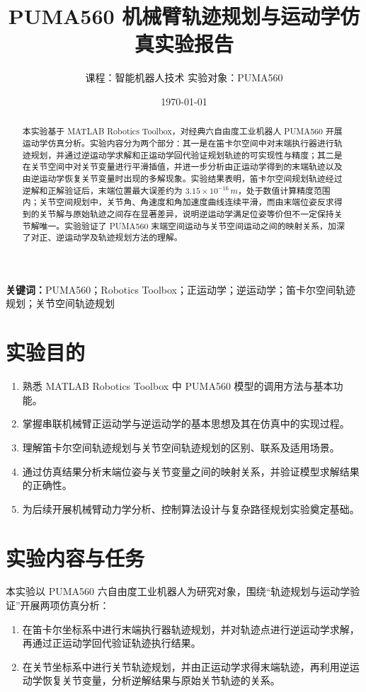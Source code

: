 \documentclass[UTF8,a4paper,12pt]{ctexart}
\title{PUMA560 机械臂轨迹规划与运动学仿真实验报告}
\author{课程：智能机器人技术 \qquad 实验对象：PUMA560}
\date{\today}
\begin{document}
\maketitle

\begin{abstract}
本实验基于 MATLAB Robotics Toolbox，对经典六自由度工业机器人 PUMA560 开展运动学仿真分析。实验内容分为两个部分：其一是在笛卡尔空间中对末端执行器进行轨迹规划，并通过逆运动学求解和正运动学回代验证规划轨迹的可实现性与精度；其二是在关节空间中对关节变量进行平滑插值，并进一步分析由正运动学得到的末端轨迹以及由逆运动学恢复关节变量时出现的多解现象。实验结果表明，笛卡尔空间规划轨迹经过逆解和正解验证后，末端位置最大误差约为 $3.15\times 10^{-16}\,\si{m}$，处于数值计算精度范围内；关节空间规划中，关节角、角速度和角加速度曲线连续平滑，而由末端位姿反求得到的关节解与原始轨迹之间存在显著差异，说明逆运动学满足位姿等价但不一定保持关节解唯一。实验验证了 PUMA560 末端空间运动与关节空间运动之间的映射关系，加深了对正、逆运动学及轨迹规划方法的理解。
\end{abstract}

\noindent\textbf{关键词：}PUMA560；Robotics Toolbox；正运动学；逆运动学；笛卡尔空间轨迹规划；关节空间轨迹规划

\section{实验目的}

\begin{enumerate}
  \item 熟悉 MATLAB Robotics Toolbox 中 PUMA560 模型的调用方法与基本功能。
  \item 掌握串联机械臂正运动学与逆运动学的基本思想及其在仿真中的实现过程。
  \item 理解笛卡尔空间轨迹规划与关节空间轨迹规划的区别、联系及适用场景。
  \item 通过仿真结果分析末端位姿与关节变量之间的映射关系，并验证模型求解结果的正确性。
  \item 为后续开展机械臂动力学分析、控制算法设计与复杂路径规划实验奠定基础。
\end{enumerate}

\section{实验内容与任务}

本实验以 PUMA560 六自由度工业机器人为研究对象，围绕“轨迹规划与运动学验证”开展两项仿真分析：
\begin{enumerate}
  \item 在笛卡尔坐标系中进行末端执行器轨迹规划，并对轨迹点进行逆运动学求解，再通过正运动学回代验证轨迹执行结果。
  \item 在关节坐标系中进行关节轨迹规划，并由正运动学求得末端轨迹，再利用逆运动学恢复关节变量，分析逆解结果与原始关节轨迹的关系。
\end{enumerate}
\end{document}
